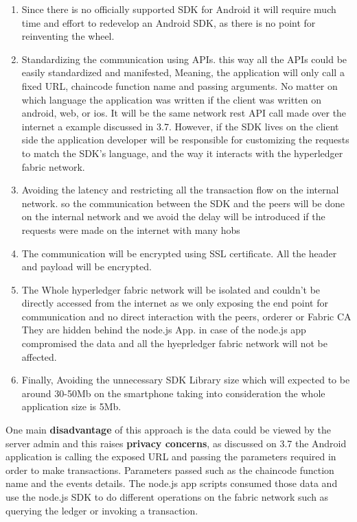 \begin{enumerate}
  \item Since there is no officially supported SDK for Android it will require much time and effort to redevelop an Android SDK, as there is no point for reinventing the wheel. 
  \item Standardizing the communication using APIs. this way all the APIs could be easily standardized and manifested, Meaning, the application will only call a fixed URL, chaincode function name and passing arguments. No matter on which language the application was written if the client was written on android, web, or ios. It will be the same network rest API call made over the internet a example discussed in 3.7. However, if the SDK lives on the client side the application developer will be responsible for customizing the requests to match the SDK's language, and the way it interacts with the hyperledger fabric network.      
  \item Avoiding the latency and restricting all the transaction flow on the internal network. so the communication between the SDK and the peers will be done on the internal network and we avoid the delay will be introduced if the requests were made on the internet with many hobs
  \item The communication will be encrypted using SSL certificate. All the header and payload will be encrypted.
  \item The Whole hyperledger fabric network will be isolated and couldn't be directly accessed from the internet as we only exposing the end point for communication and no direct interaction with the peers, orderer or Fabric CA They are hidden behind the node.js App. in case of the node.js app compromised the data and all the hyeprledger fabric network will not be affected. 
  \item Finally, Avoiding the unnecessary SDK Library size which will expected to be around 30-50Mb on the smartphone taking into consideration the whole application size is 5Mb. 
\end{enumerate}
\clearpage
\noindent One main \textbf{disadvantage} of this approach is the data could be viewed by the server admin and this raises \textbf{privacy concerns}, as discussed on 3.7 the Android application is calling the exposed URL and passing the parameters required in order to make transactions.  Parameters passed such as the chaincode function name and the events details.
The node.js app scripts consumed those data and use the node.js SDK to do different operations on the fabric network such as querying the ledger or invoking a transaction. 
